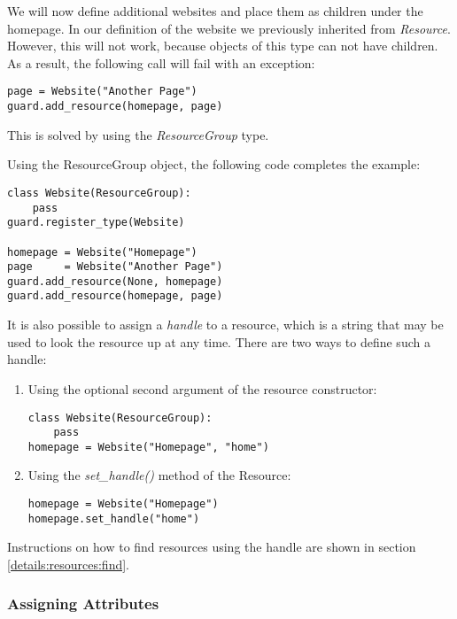 We will now define additional websites and place them as children under the 
homepage. In our definition of the website we previously inherited from 
{\it Resource}. However, this will not work, because objects of this type 
can not have children. As a result, the following call will fail with an 
exception:

\begin{lstlisting}
page = Website("Another Page")
guard.add_resource(homepage, page)
\end{lstlisting}

This is solved by using the {\it ResourceGroup} type.


Using the ResourceGroup object, the following code completes the example:

\begin{lstlisting}
class Website(ResourceGroup):
    pass
guard.register_type(Website)

homepage = Website("Homepage")
page     = Website("Another Page")
guard.add_resource(None, homepage)
guard.add_resource(homepage, page)
\end{lstlisting}

It is also possible to assign a {\it handle} to a resource, which is a string 
that may be used to look the resource up at any time. There are two ways to 
define such a handle:

\begin{enumerate}
\item Using the optional second argument of the resource constructor:

\begin{lstlisting}
class Website(ResourceGroup):
    pass
homepage = Website("Homepage", "home")
\end{lstlisting}

\item Using the {\it set\_handle()} method of the Resource:

\begin{lstlisting}
homepage = Website("Homepage")
homepage.set_handle("home")
\end{lstlisting}
\end{enumerate}

Instructions on how to find resources using the handle are shown in section 
\ref{details:resources:find}.


\subsubsection{\label{details:resources:attributes}Assigning Attributes}

